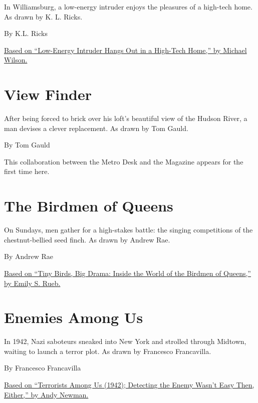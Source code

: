In Williamsburg, a low-energy intruder enjoys the pleasures of a
high-tech home. As drawn by K. L. Ricks.

By K.L. Ricks

\href{https://www.nytimes3xbfgragh.onion/2017/03/05/nyregion/intruder-brooklyn-apartment.html}{Based
on ``Low-Energy Intruder Hangs Out in a High-Tech Home,'' by Michael
Wilson.}

\hypertarget{view-finder}{%
\section{View Finder}\label{view-finder}}

After being forced to brick over his loft's beautiful view of the Hudson
River, a man devises a clever replacement. As drawn by Tom Gauld.

By Tom Gauld

This collaboration between the Metro Desk and the Magazine appears for
the first time here.

\hypertarget{the-birdmen-of-queens}{%
\section{The Birdmen of Queens}\label{the-birdmen-of-queens}}

On Sundays, men gather for a high-stakes battle: the singing
competitions of the chestnut-bellied seed finch. As drawn by Andrew Rae.

By Andrew Rae

\href{https://www.nytimes3xbfgragh.onion/2015/08/02/nyregion/tiny-birds-big-drama-inside-the-world-of-the-birdmen-of-queens.html}{Based
on ``Tiny Birds, Big Drama: Inside the World of the Birdmen of Queens,''
by Emily S. Rueb.}

\hypertarget{enemies-among-us}{%
\section{Enemies Among Us}\label{enemies-among-us}}

In 1942, Nazi saboteurs sneaked into New York and strolled through
Midtown, waiting to launch a terror plot. As drawn by Francesco
Francavilla.

By Francesco Francavilla

\href{http://www.nytimes3xbfgragh.onion/2002/01/17/nyregion/terrorists-among-us-1942-detecting-the-enemy-wasn-t-easy-then-either.html}{Based
on ``Terrorists Among Us (1942); Detecting the Enemy Wasn't Easy Then,
Either,'' by Andy Newman.}

